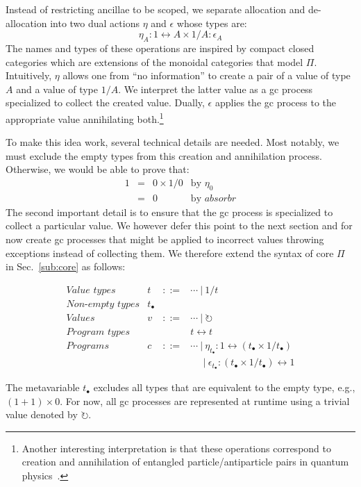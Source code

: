 \documentclass[sigplan,10pt,review,anonymous]{acmart}
\newcommand{\alt}{~|~}
\newcommand{\net}{t_\bullet}
\newcommand{\gcv}{\circlearrowright}
\newcommand{\oneover}[1]{1/#1}
\newcommand{\absorbr}{\mathit{absorbr}}
\begin{document}
Instead of restricting ancillae to be scoped, we separate allocation
and de-allocation into two dual actions $\eta$ and $\epsilon$ whose
types are:
\[
\eta_A : 1 \leftrightarrow A \times \oneover{A} : \epsilon_A
\]
The names and types of these operations are inspired by compact closed
categories which are extensions of the monoidal categories that model
$\Pi$. Intuitively, $\eta$ allows one from ``no information'' to
create a pair of a value of type $A$ and a value of type
$\oneover{A}$. We interpret the latter value as a gc process
specialized to collect the created value. Dually, $\epsilon$ applies
the gc process to the appropriate value annihilating
both.\footnote{Another interesting interpretation is that these
  operations correspond to creation and annihilation of entangled
  particle/antiparticle pairs in quantum
  physics~\cite{Panangaden2011}.}

To make this idea work, several technical details are needed. Most
notably, we must exclude the empty types from this creation and
annihilation process. Otherwise, we would be able to prove that:
\[\begin{array}{rcll}
1 &=& 0 \times 1/0 & \textrm{by~} \eta_0 \\
&=& 0 & \textrm{by~} \absorbr
\end{array}\]
The second important detail is to ensure that the gc process is
specialized to collect a particular value. We however defer this point to
the next section and for now create gc processes that might be applied
to incorrect values throwing exceptions instead of collecting them. We
therefore extend the syntax of core $\Pi$ in Sec.~\ref{sub:core} as
follows:

\[\begin{array}{lrcl}
\textit{Value types} & t &::=& \cdots \alt \oneover{t} \\
\textit{Non-empty types} & \net \\
\textit{Values}      & v &::=& \cdots \alt \gcv \\
\textit{Program types} &&& t \leftrightarrow t \\
\textit{Programs} & c &::=& \cdots \alt
   \eta_{\net} : 1 \leftrightarrow (\net \times \oneover{\net}) \\
   &&& ~~~~~\alt \epsilon_{\net} : (\net \times \oneover{\net}) \leftrightarrow 1
\end{array}\]

The metavariable $\net$ excludes all types that are equivalent to the
empty type, e.g., $(1 + 1) \times 0$. For now, all gc processes are
represented at runtime using a trivial value denoted by $\gcv$.
\end{document}
